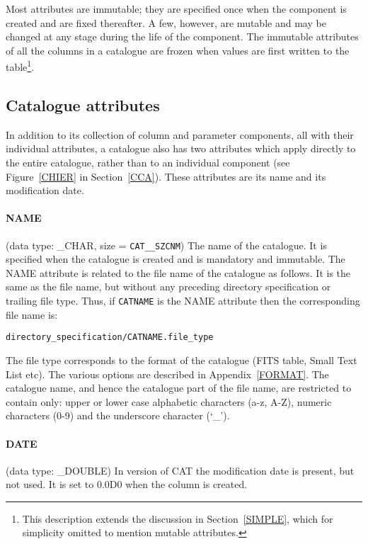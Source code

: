 Most attributes are immutable; they are specified once when the 
component is created and are fixed thereafter. A few, however, are 
mutable and may be changed at any stage during the life of the 
component. The immutable attributes of all the columns in a catalogue
are frozen when values are first written to the table\footnote{This 
description extends the discussion in Section~\ref{SIMPLE}, which for 
simplicity omitted to mention mutable attributes.}.

\subsection{Catalogue attributes}

In addition to its collection of column and parameter 
components,
all with their individual attributes, a catalogue also has two 
attributes which apply directly to the entire catalogue, rather than to
an individual component (see Figure~\ref{CHIER} in Section~\ref{CCA}).
These attributes are its name and its modification date.

\paragraph{NAME} 
(data type: \_CHAR, size = {\tt CAT\_\_SZCNM}) The name of the 
catalogue. It is specified when the catalogue is created and is 
mandatory and immutable. The NAME attribute is related to the file name
of the catalogue as follows. It is the same as the file name, but
without any preceding directory specification or trailing file type.
Thus, if {\tt CATNAME} is the NAME attribute then the corresponding
file name is:

\begin{center}
{\tt directory\_specification/CATNAME.file\_type}
\end{center}

The file type corresponds to the format of the catalogue (FITS table,
Small Text List etc). The various options are described in
Appendix~\ref{FORMAT}.  The catalogue name, and hence the catalogue part
of the file name, are restricted to contain only: upper or lower case
alphabetic characters (a-z, A-Z), numeric characters (0-9) and the
underscore character (`\_'). 

\paragraph{DATE}
(data type: \_DOUBLE)
In version \CATversion of CAT the modification date is present, but 
not used. It is set to 0.0D0 when the column is created.


